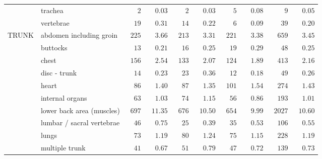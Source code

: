 \documentclass[9pt, oneside]{article}   	%
\begin{document}
\begin{longtable}{p{1.8in}p{2.2in}cccccccc}
 & trachea  & $\phantom{000}2$ & $\phantom{00}0.03$ & $\phantom{000}2$ & $\phantom{00}0.03$ & $\phantom{000}5$ & $\phantom{00}0.08$ & $\phantom{0000}9$ & $\phantom{00}0.05$ \\
 & vertebrae  & $\phantom{00}19$ & $\phantom{00}0.31$ & $\phantom{00}14$ & $\phantom{00}0.22$ & $\phantom{000}6$ & $\phantom{00}0.09$ & $\phantom{000}39$ & $\phantom{00}0.20$ \\
TRUNK & abdomen including groin  & $\phantom{0}225$ & $\phantom{00}3.66$ & $\phantom{0}213$ & $\phantom{00}3.31$ & $\phantom{0}221$ & $\phantom{00}3.38$ & $\phantom{00}659$ & $\phantom{00}3.45$ \\
 & buttocks  & $\phantom{00}13$ & $\phantom{00}0.21$ & $\phantom{00}16$ & $\phantom{00}0.25$ & $\phantom{00}19$ & $\phantom{00}0.29$ & $\phantom{000}48$ & $\phantom{00}0.25$ \\
 & chest  & $\phantom{0}156$ & $\phantom{00}2.54$ & $\phantom{0}133$ & $\phantom{00}2.07$ & $\phantom{0}124$ & $\phantom{00}1.89$ & $\phantom{00}413$ & $\phantom{00}2.16$ \\
 & disc - trunk  & $\phantom{00}14$ & $\phantom{00}0.23$ & $\phantom{00}23$ & $\phantom{00}0.36$ & $\phantom{00}12$ & $\phantom{00}0.18$ & $\phantom{000}49$ & $\phantom{00}0.26$ \\
 & heart  & $\phantom{00}86$ & $\phantom{00}1.40$ & $\phantom{00}87$ & $\phantom{00}1.35$ & $\phantom{0}101$ & $\phantom{00}1.54$ & $\phantom{00}274$ & $\phantom{00}1.43$ \\
 & internal organs  & $\phantom{00}63$ & $\phantom{00}1.03$ & $\phantom{00}74$ & $\phantom{00}1.15$ & $\phantom{00}56$ & $\phantom{00}0.86$ & $\phantom{00}193$ & $\phantom{00}1.01$ \\
 & lower back area (muscles)  & $\phantom{0}697$ & $\phantom{0}11.35$ & $\phantom{0}676$ & $\phantom{0}10.50$ & $\phantom{0}654$ & $\phantom{00}9.99$ & $\phantom{0}2027$ & $\phantom{0}10.60$ \\
 & lumbar / sacral vertebrae  & $\phantom{00}46$ & $\phantom{00}0.75$ & $\phantom{00}25$ & $\phantom{00}0.39$ & $\phantom{00}35$ & $\phantom{00}0.53$ & $\phantom{00}106$ & $\phantom{00}0.55$ \\
 & lungs  & $\phantom{00}73$ & $\phantom{00}1.19$ & $\phantom{00}80$ & $\phantom{00}1.24$ & $\phantom{00}75$ & $\phantom{00}1.15$ & $\phantom{00}228$ & $\phantom{00}1.19$ \\
 & multiple trunk  & $\phantom{00}41$ & $\phantom{00}0.67$ & $\phantom{00}51$ & $\phantom{00}0.79$ & $\phantom{00}47$ & $\phantom{00}0.72$ & $\phantom{00}139$ & $\phantom{00}0.73$ \\

\end{longtable}
\end{document}
